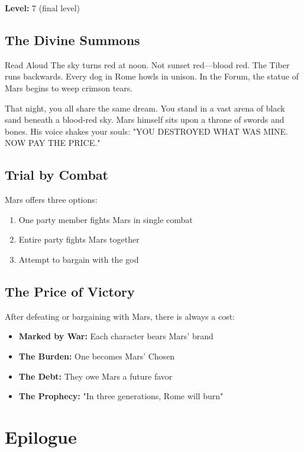 \documentclass[letterpaper,oneside,twocolumn,openany]{dndbook}
\begin{document}
\textbf{Level:} 7 (final level)

\section{The Divine Summons}

\begin{paperbox}{Read Aloud}
The sky turns red at noon. Not sunset red—blood red. The Tiber runs backwards. Every dog in Rome howls in unison. In the Forum, the statue of Mars begins to weep crimson tears.

That night, you all share the same dream. You stand in a vast arena of black sand beneath a blood-red sky. Mars himself sits upon a throne of swords and bones. His voice shakes your souls: "YOU DESTROYED WHAT WAS MINE. NOW PAY THE PRICE."
\end{paperbox}

\section{Trial by Combat}

Mars offers three options:
\begin{enumerate}
\item One party member fights Mars in single combat
\item Entire party fights Mars together
\item Attempt to bargain with the god
\end{enumerate}

\section{The Price of Victory}

After defeating or bargaining with Mars, there is always a cost:

\begin{itemize}
\item \textbf{Marked by War:} Each character bears Mars' brand
\item \textbf{The Burden:} One becomes Mars' Chosen
\item \textbf{The Debt:} They owe Mars a future favor
\item \textbf{The Prophecy:} "In three generations, Rome will burn"
\end{itemize}

\chapter{Epilogue}
\end{document}
